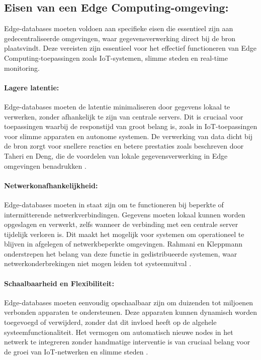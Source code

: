 \subsection{Eisen van een Edge Computing-omgeving:}
Edge-databases moeten voldoen aan specifieke eisen die essentieel zijn aan gedecentraliseerde omgevingen, waar gegevensverwerking direct bij de bron plaatsvindt. Deze vereisten zijn essentieel voor het effectief functioneren van Edge Computing-toepassingen zoals IoT-systemen, slimme steden en real-time monitoring.

\paragraph{Lagere latentie:} 
   Edge-databases moeten de latentie minimaliseren door gegevens lokaal te verwerken, zonder afhankelijk te zijn van centrale servers. Dit is cruciaal voor toepassingen waarbij de responstijd van groot belang is, zoals in IoT-toepassingen voor slimme apparaten en autonome systemen. De verwerking van data dicht bij de bron zorgt voor snellere reacties en betere prestaties zoals beschreven door Taheri en Deng, die de voordelen van lokale gegevensverwerking in Edge omgevingen benadrukken \autocite{Taheri2020}.

\paragraph{Netwerkonafhankelijkheid:}
   Edge-databases moeten in staat zijn om te functioneren bij beperkte of intermitterende netwerkverbindingen. Gegevens moeten lokaal kunnen worden opgeslagen en verwerkt, zelfs wanneer de verbinding met een centrale server tijdelijk verloren is. Dit maakt het mogelijk voor systemen om operationeel te blijven in afgelegen of netwerkbeperkte omgevingen. Rahmani en Kleppmann onderstrepen het belang van deze functie in gedistribueerde systemen, waar netwerkonderbrekingen niet mogen leiden tot systeemuitval \autocite{Rahmani2018, Kleppmann2017}.

\paragraph{Schaalbaarheid en Flexibiliteit:}
   Edge-databases moeten eenvoudig opschaalbaar zijn om duizenden tot miljoenen verbonden apparaten te ondersteunen. Deze apparaten kunnen dynamisch worden toegevoegd of verwijderd, zonder dat dit invloed heeft op de algehele systeemfunctionaliteit. Het vermogen om automatisch nieuwe nodes in het netwerk te integreren zonder handmatige interventie is van cruciaal belang voor de groei van IoT-netwerken en slimme steden \autocite{Rahmani2018}.

